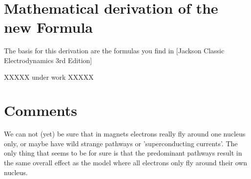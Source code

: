 \documentclass[12pt,a4paper,twocolumn]{article}
\begin{document}
\section {Mathematical derivation of the new Formula}
The basis for this derivation are the formulas you find in [Jackson Classic Electrodynamics 3rd Edition]

XXXXX under work XXXXX

\section{Comments}
We can not (yet) be sure that in magnets electrons really fly around one nucleus only, or maybe have wild strange pathways or 'superconducting currents'. The only thing that seems to be for sure is that the predominant pathways result in the same overall effect as the model where all electrons only fly around their own nucleus.
\end{document}
